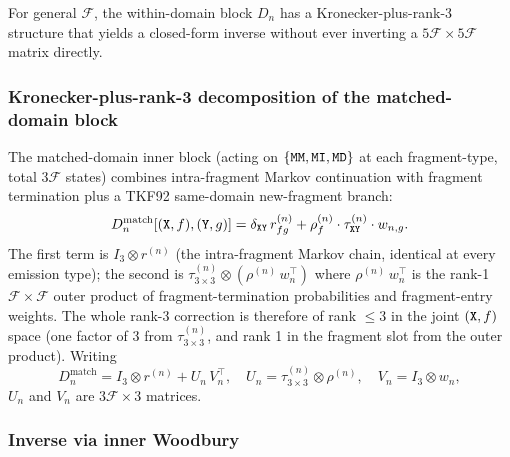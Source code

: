 \documentclass{article}
\newcommand\ext{r}
\newcommand\notext{\rho}
\newcommand\dom{n}
\newcommand\nfrag{\mathcal{F}}
\newcommand\fragdist{w}
\newcommand\tkftrans{\tau}
\newcommand\mat{{\tt M}}
\newcommand\ins{{\tt I}}
\newcommand\del{{\tt D}}
\newcommand\xstate{{\tt X}}
\newcommand\ystate{{\tt Y}}
\newcommand\frag{f}
\newcommand\destfrag{g}
\begin{document}
For general $\nfrag$, the within-domain block $D_\dom$ has a
Kronecker-plus-rank-3 structure that yields a closed-form inverse
without ever inverting a $5\nfrag \times 5\nfrag$ matrix directly.

\subsubsection{Kronecker-plus-rank-3 decomposition of the matched-domain block}

The matched-domain inner block (acting on
$\{\mat\mat, \mat\ins, \mat\del\}$ at each fragment-type, total
$3\nfrag$ states) combines intra-fragment Markov continuation with
fragment termination plus a TKF92 same-domain new-fragment branch:
\begin{equation}\label{eq:mixdom-D-match}
D_\dom^{\text{match}}[(\xstate, \frag), (\ystate, \destfrag)]
= \delta_{\xstate\ystate}\, \ext^{(\dom)}_{\frag\destfrag}
+ \notext^{(\dom)}_\frag \cdot
  \tkftrans^{(\dom)}_{\xstate\ystate} \cdot
  \fragdist_{\dom,\destfrag}.
\end{equation}
The first term is $I_{3} \otimes \ext^{(\dom)}$ (the
intra-fragment Markov chain, identical at every emission type);
the second is
$\tkftrans^{(\dom)}_{3\times 3} \otimes (\notext^{(\dom)}\, \fragdist_\dom^\top)$
where $\notext^{(\dom)}\, \fragdist_\dom^\top$ is the rank-1
$\nfrag \times \nfrag$ outer product of fragment-termination
probabilities and fragment-entry weights.
The whole rank-3 correction is therefore of rank $\leq 3$ in the joint
$(\xstate,\frag)$ space (one factor of 3 from
$\tkftrans^{(\dom)}_{3\times 3}$, and rank 1 in the fragment slot
from the outer product). Writing
\[
D_\dom^{\text{match}} = I_{3} \otimes \ext^{(\dom)}
+ U_\dom\, V_\dom^\top,
\quad
U_\dom = \tkftrans^{(\dom)}_{3\times 3} \otimes \notext^{(\dom)},
\quad
V_\dom = I_{3} \otimes \fragdist_\dom,
\]
$U_\dom$ and $V_\dom$ are $3\nfrag \times 3$ matrices.

\subsubsection{Inverse via inner Woodbury}
\end{document}

